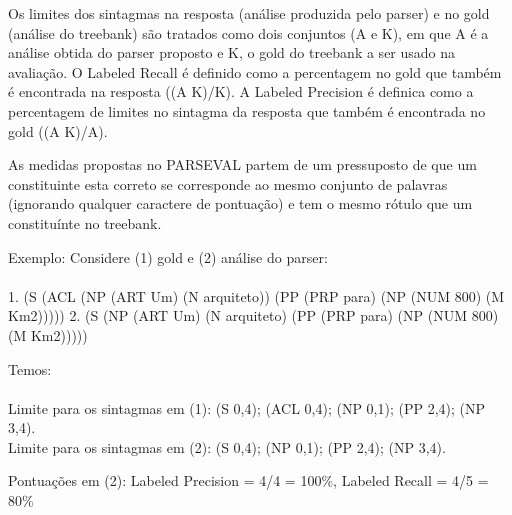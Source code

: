 Os limites dos sintagmas na resposta (análise produzida pelo parser) e no gold (análise do treebank) são tratados como dois conjuntos (A e K), em que A é a análise obtida do parser proposto e K, o gold do treebank a ser usado na avaliação. O Labeled Recall
é definido como a percentagem no gold que também é encontrada na resposta ((A K)/K). A Labeled Precision é definica como a percentagem de limites no sintagma da resposta que também é encontrada no gold ((A K)/A).

As medidas propostas no PARSEVAL partem de um pressuposto de que um constituinte esta correto se corresponde ao mesmo conjunto de palavras (ignorando qualquer caractere de pontuação) e tem o mesmo rótulo que um constituínte no treebank.


Exemplo: Considere (1) gold e (2) análise do parser:\\ \\

1. (S (ACL (NP (ART Um) (N arquiteto)) (PP (PRP para) (NP (NUM 800) (M Km2)))))
2. (S (NP (ART Um) (N arquiteto) (PP (PRP para) (NP (NUM 800) (M Km2)))))

Temos:\\ \\
Limite para os sintagmas em (1): (S 0,4); (ACL 0,4); (NP 0,1); (PP 2,4); (NP 3,4). \\
Limite para os sintagmas em (2): (S 0,4); (NP 0,1); (PP 2,4); (NP 3,4).

Pontuações em (2): Labeled Precision = 4/4 = 100{\%}, Labeled Recall = 4/5 = 80{\%}




